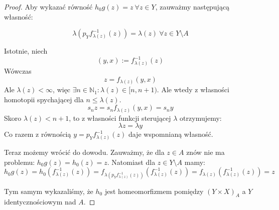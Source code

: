 \begin{thm}
\begin{proof}
    Aby wykazać równość $h_0g(z) = z\ \forall z \in Y$, zauważmy następującą własność:
    
    $$\lambda(p_Y f_{\lambda(z)}^{-1}(z)) = \lambda(z)\ \forall z \in Y \setminus A$$
    
    Istotnie, niech
    $$(y,x) := f_{\lambda(z)}^{-1}(z)$$
    Wówczas
    $$z = f_{\lambda(z)}(y,x)$$
    Ale $\lambda(z) < \infty$, więc $\exists n \in \mathbb{N}_1: \lambda(z) \in [n, n+1)$. Ale wtedy z własności homotopii spychającej dla $n \leq \lambda(z)$.
    $$s_n z = s_n f_{\lambda(z)}(y,x) = s_n y$$
    Skoro $\lambda(z) < n+1$, to z własności funkcji sterującej $\lambda$ otrzymujemy:
    $$\lambda z = \lambda y$$
    Co razem z równością $y = p_Y f_{\lambda(z)}^{-1}(z)$ daje wspomnianą własność.
    
    Teraz możemy wrócić do dowodu. Zauważmy, że dla $z \in A$ znów nie ma problemu: $h_0g(z) = h_0(z) = z$. Natomiast dla $z \in Y \setminus A$ mamy:
    $$h_0g(z) = h_0(f_{\lambda(z)}^{-1}(z)) = f_{\lambda(p_Y f_{\lambda(z)}^{-1}(z))}(f_{\lambda(z)}^{-1}(z)) = f_{\lambda(z)}(f_{\lambda(z)}^{-1}(z)) = z$$
    
    Tym samym wykazaliśmy, że $h_0$ jest homeomorfizmem pomiędzy $(Y \times X)_A$ a $Y$ identycznościowym nad $A$.
  \end{proof}
\end{thm}
